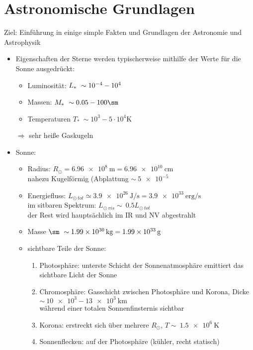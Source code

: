 \section{Astronomische Grundlagen}
Ziel: Einführung in einige simple Fakten und Grundlagen der Astronomie und Astrophysik
\begin{itemize}[label={$\to$}]
	\item Eigenschaften der Sterne werden typischerweise mithilfe der Werte für die Sonne ausgedrückt:
	\begin{itemize}
		\item Luminosität: $L_\ast \ \sim 10^{-4}-10^{4} \si{\sl}$
		\item Massen: $M_\ast \ \sim 0.05 - 100 \si{\sm}$
		\item Temperaturen $T_\ast \ \sim 10^3 - 5\cdot 10^4 \si{\K}$
	\end{itemize}
	\item[$\Rightarrow$] sehr heiße Gaskugeln
	\item Sonne:
		\begin{itemize}[label={$\bullet$}]
			\item Radius: $R_\odot = \SI{6.96e8}{\m} = \SI{6.96e10}{\cm}$\\
				nahezu Kugelförmig (Abplattung $\sim \ \num{5e-5}$
			\item Energiefluss: $L_{\odot \ tot} \simeq \SI{3.9e26}{\J\per\s}=\SI{3.9e33}{\text{erg}\per\s}$\\
				im sitbaren Spektrum: $L_{\odot \ vis} \sim \ \num{0.5}L_{\odot \ tot}$\\
				der Rest wird hauptsächlich im IR und NV abgestrahlt
			\item Masse $\si{\sm} \ \sim \SI{1.99e30}{\kg}=\SI{1.99e33}{\g}$
			\item sichtbare Teile der Sonne:
				\begin{enumerate}[label={(\alph*)}]
					\item Photosphäre: unterste Schicht der Sonnenatmosphäre emittiert das sichtbare Licht der Sonne
					\item Chromosphäre: Gasschicht zwischen Photosphäre und Korona, Dicke $\sim \ \num{10e3}-\SI{13e3}{\km}$\\
						während einer totalen Sonnenfinsternis sichtbar
					\item Korona: erstreckt sich über mehrere $R_\odot$, $T \sim \ \SI{1.5e6}{\K}$
					\item Sonnenflecken: auf der Photosphäre (kühler, recht statisch)
						\begin{itemize}[label={$\to$}]

\end{itemize}
\end{enumerate}
\end{itemize}
\end{itemize}
